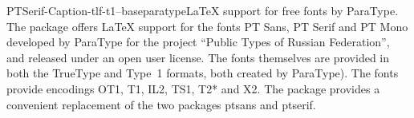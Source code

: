 \documentclass{ddltxtyp}
\begin{document}
\begin{package}{PTSerif-Caption-tlf-t1--base}{paratype}{{\LaTeX} support for free fonts by ParaType.}
The package offers {\LaTeX} support for the fonts PT Sans, PT
Serif and PT Mono developed by ParaType for the project ``Public
Types of Russian Federation'', and released under an open user
license. The fonts themselves are provided in both the TrueType
and Type~1 formats, both created by ParaType). The fonts
provide encodings OT1, T1, IL2, TS1, T2* and X2. The package
provides a convenient replacement of the two packages ptsans
and ptserif.
\end{package}
\end{document}
